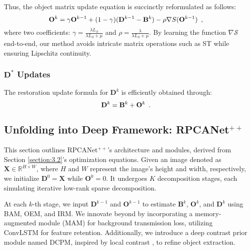 \documentclass[10pt,journal,compsoc]{IEEEtran}
\begin{document}
Thus, the object matrix update equation is succinctly reformulated as follows:
\begin{equation}
\setlength{\abovedisplayskip}{1pt}
\setlength{\belowdisplayskip}{1pt}
{\mathbf{O}^k}= \gamma {\mathbf{O}^{k-1}} + (1-\gamma )(\mathbf{D}^{k-1}-\mathbf{B}^k)-\rho \nabla S({\mathbf{O}^{k - 1}})\enspace,
\label{eq:upt}
\end{equation}
where two coefficients: $\gamma\!=\!\frac{{\lambda {L_S}}}{{\lambda {L_S}\!+\!\mu }}$ and $\rho\!=\!\frac{\lambda}{{\lambda {L_S}\!+\!\mu }}$. By learning the function $\nabla\mathcal{S}$ end-to-end, our method avoids intricate matrix operations such as ST while ensuring Lipschitz continuity.
\subsubsection{$\mathbf{D}^*$ Updates} 
The restoration update formula for $\mathbf{D}^{k}$ is efficiently obtained through:
\begin{equation}
\setlength{\abovedisplayskip}{-1pt}
\setlength{\belowdisplayskip}{0pt}
    {\mathbf{D}^k}={\mathbf{B}^k}+{\mathbf{O}^k}\enspace.
    \label{finald}
\end{equation}
\subsection{Unfolding into Deep Framework: RPCANet$^{++}$}
\label{sec:3.3}
This section outlines RPCANet$^{++}$'s architecture and modules, derived from Section \ref{section:3.2}'s optimization equations. 
Given an image denoted as $\mathbf{X} \in \mathbb{R}^{H\times W}$, where $H$ and $W$ represent the image's height and width, respectively, we initialize $\mathbf{D}^0 = \mathbf{X}$ while $\mathbf{O}^0 = 0$.
It undergoes $K$ decomposition stages, each simulating iterative low-rank sparse decomposition.

At each $k$-th stage, we input $\mathbf{D}^{k-1}$ and $\mathbf{O}^{k-1}$ to estimate $\mathbf{B}^k$, $\mathbf{O}^k$, and $\mathbf{D}^k$ using BAM, OEM, and IRM. We innovate beyond \cite{wu-2024-rpcanet} by incorporating a memory-augmented module (MAM) for background transmission loss, utilizing ConvLSTM \cite{shi-2015-lstm} for feature retention. Additionally, we introduce a deep contrast prior module named DCPM, inspired by local contrast \cite{yu-2020-cdc,ying-2022-moco,zhang2025irmamba,wu-2025-l2sknet}, to refine object extraction.
\end{document}
